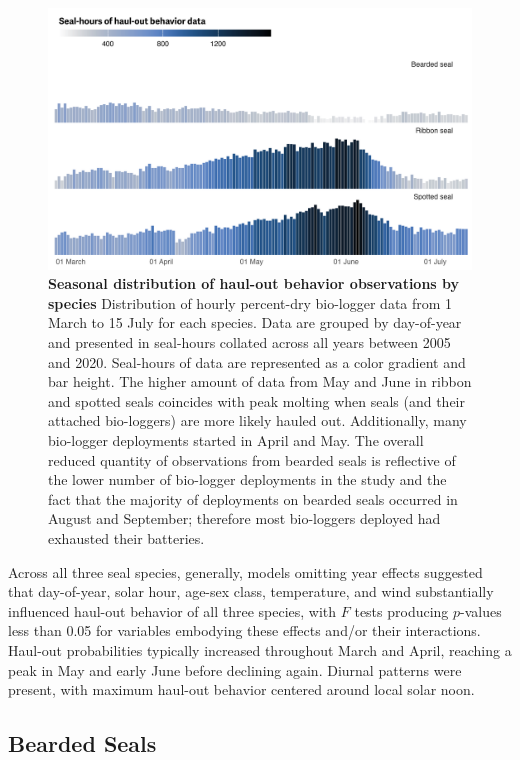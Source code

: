 \documentclass[fleqn,10pt,lineno]{wlpeerj} %
\begin{document}
\begin{figure}
\includegraphics[width=1\linewidth]{../figures/Figure-004} \caption{\textbf{Seasonal distribution of haul-out behavior observations by species} \linebreak Distribution of hourly percent-dry bio-logger data from 1 March to 15 July for each species. Data are grouped by day-of-year and presented in seal-hours collated across all years between 2005 and 2020. Seal-hours of data are represented as a color gradient and bar height. The higher amount of data from May and June in ribbon and spotted seals coincides with peak molting when seals (and their attached bio-loggers) are more likely hauled out. Additionally, many bio-logger deployments started in April and May. The overall reduced quantity of observations from bearded seals is reflective of the lower number of bio-logger deployments in the study and the fact that the majority of deployments on bearded seals occurred in August and September; therefore most bio-loggers deployed had exhausted their batteries.}\label{fig:dataCal}
\end{figure}

Across all three seal species, generally, models omitting year effects suggested
that day-of-year, solar hour, age-sex class, temperature, and wind substantially
influenced haul-out behavior of all three species, with \(F\) tests producing
\(p\)-values less than 0.05 for variables embodying these effects and/or their
interactions. Haul-out probabilities typically increased throughout March and
April, reaching a peak in May and early June before declining again. Diurnal
patterns were present, with maximum haul-out behavior centered around local
solar noon.

\subsection*{Bearded Seals}\label{bearded-seals}
\end{document}
